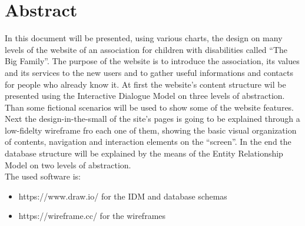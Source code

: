 %
%
%
\chapter{Abstract}
%
%
%
In this document will be presented, using various charts, the design on many levels of the website of an association for children with disabilities called ``The Big Family''. The purpose of the website is to introduce the association, its values and its services to the new users and to gather useful informations and contacts for people who already know it.
\linebreak
\linebreak
At first the website's content structure wil be presented using the Interactive Dialogue Model on three levels of abstraction. Than some fictional scenarios will be used to show some of the website features. Next the design-in-the-small of the site's pages is going to be explained through a low-fidelty wireframe fro each one of them, showing the basic visual organization of contents, navigation and interaction elements on the “screen”. In the end the database structure will be explained by the means of the Entity Relationship Model on two levels of abstraction.\\
\linebreak
The used software is:
\begin{itemize}

\item https://www.draw.io/ for the IDM and database schemas
\item https://wireframe.cc/ for the wireframes

\end{itemize}
%
